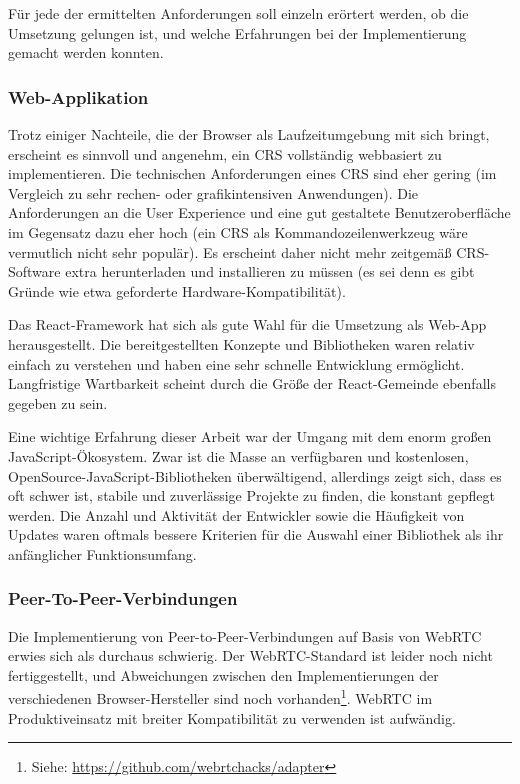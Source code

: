 Für jede der ermittelten Anforderungen soll einzeln erörtert werden, ob die Umsetzung gelungen ist, und welche Erfahrungen bei der Implementierung gemacht werden konnten.

\subsubsection*{Web-Applikation}
Trotz einiger Nachteile, die der Browser als Laufzeitumgebung mit sich bringt, erscheint es sinnvoll und angenehm, ein CRS vollständig webbasiert zu implementieren. Die technischen Anforderungen eines CRS sind eher gering (im Vergleich zu sehr rechen- oder grafikintensiven Anwendungen). Die Anforderungen an die User Experience und eine gut gestaltete Benutzeroberfläche im Gegensatz dazu eher hoch (ein CRS als Kommandozeilenwerkzeug wäre vermutlich nicht sehr populär). Es erscheint daher nicht mehr zeitgemäß CRS-Software extra herunterladen und installieren zu müssen (es sei denn es gibt Gründe wie etwa geforderte Hardware-Kompatibilität).

Das React-Framework hat sich als gute Wahl für die Umsetzung als Web-App herausgestellt. Die bereitgestellten Konzepte und Bibliotheken waren relativ einfach zu verstehen und haben eine sehr schnelle Entwicklung ermöglicht. Langfristige Wartbarkeit scheint durch die Größe der React-Gemeinde ebenfalls gegeben zu sein.

Eine wichtige Erfahrung dieser Arbeit war der Umgang mit dem enorm großen JavaScript-Ökosystem. Zwar ist die Masse an verfügbaren und kostenlosen, OpenSource-JavaScript-Bibliotheken überwältigend, allerdings zeigt sich, dass es oft schwer ist, stabile und zuverlässige Projekte zu finden, die konstant gepflegt werden. Die Anzahl und Aktivität der Entwickler sowie die Häufigkeit von Updates waren oftmals bessere Kriterien für die Auswahl einer Bibliothek als ihr anfänglicher Funktionsumfang.

\subsubsection*{Peer-To-Peer-Verbindungen}
Die Implementierung von Peer-to-Peer-Verbindungen auf Basis von WebRTC erwies sich als durchaus schwierig. Der WebRTC-Standard ist leider noch nicht fertiggestellt, und  Abweichungen zwischen den Implementierungen der verschiedenen Browser-Hersteller sind noch vorhanden\footnote{Siehe: \url{https://github.com/webrtchacks/adapter}}. WebRTC im Produktiveinsatz mit breiter Kompatibilität zu verwenden ist aufwändig.


